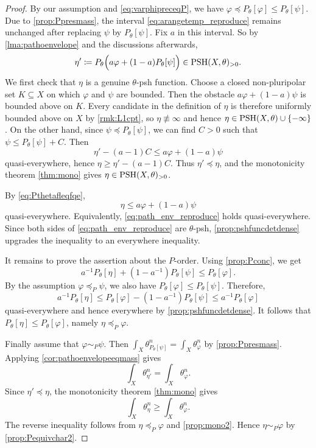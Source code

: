 \begin{proof}
    By our assumption and \eqref{eq:varphipreceqP}, we have $\varphi\preceq P_{\theta}[\varphi]\leq P_{\theta}[\psi]$.
    Due to \cref{prop:Ppresmass}, the interval \eqref{eq:arangetemp_reproduce} remains unchanged after replacing $\psi$ by $P_{\theta}[\psi]$. Fix $a$ in this interval.
    So by \cref{lma:pathoenvelope} and the discussions afterwards,
    \[
        \eta'\coloneqq  P_{\theta}\Bigl(a\varphi+(1-a)P_{\theta}[\psi]\Bigr)\in \mathrm{PSH}(X,\theta)_{>0}.
    \]
    We first check that $\eta$ is a genuine $\theta$-psh function. Choose a closed non-pluripolar set $K\subseteq X$ on which $\varphi$ and $\psi$ are bounded. Then the obstacle $a\varphi+(1-a)\psi$ is bounded above on $K$.
    Every candidate in the definition of $\eta$ is therefore uniformly bounded above on $X$ by \cref{rmk:L1cpt}, so $\eta\not\equiv \infty$ and hence $\eta\in \mathrm{PSH}(X,\theta)\cup\{-\infty\}$.
    On the other hand, since $\psi\preceq P_{\theta}[\psi]$, we can find $C>0$ such that $\psi\leq P_{\theta}[\psi]+C$. Then
    \[
        \eta'-(a-1)C\leq a\varphi+(1-a)\psi
    \]
    quasi-everywhere, hence $\eta\geq \eta'-(a-1)C$. Thus $\eta'\preceq \eta$, and the monotonicity theorem \cref{thm:mono} gives $\eta\in \mathrm{PSH}(X,\theta)_{>0}$.

    By \eqref{eq:Pthetafleqfqe},
    \[
        \eta\leq a\varphi+(1-a)\psi
    \]
    quasi-everywhere. Equivalently, \eqref{eq:path_env_reproduce} holds quasi-everywhere. Since both sides of \eqref{eq:path_env_reproduce} are $\theta$-psh, \cref{prop:pshfuncdetdense} upgrades the inequality to an everywhere inequality.

    It remains to prove the assertion about the $P$-order.
    Using \cref{prop:Pconc}, we get
    \[
        a^{-1} P_{\theta}[\eta]+\left(1-a^{-1}\right)P_{\theta}[\psi] \leq P_{\theta}[\varphi].
    \]
    By the assumption $\varphi\preceq_P\psi$, we also have $P_{\theta}[\varphi]\leq P_{\theta}[\psi]$. Therefore,
    \[
        a^{-1} P_{\theta}[\eta]\leq P_{\theta}[\varphi]-\left(1-a^{-1}\right)P_{\theta}[\psi]\leq a^{-1} P_{\theta}[\varphi]
    \]
    quasi-everywhere and hence everywhere by \cref{prop:pshfuncdetdense}. It follows that $P_{\theta}[\eta]\leq P_{\theta}[\varphi]$, namely $\eta\preceq_P\varphi$.

    Finally assume that $\varphi\sim_P\psi$. Then $\int_X\theta_{P_{\theta}[\psi]}^n=\int_X\theta_{\varphi}^n$ by \cref{prop:Ppresmass}.
    Applying \cref{cor:pathoenvelopeeqmass} gives
    \[
        \int_X\theta_{\eta'}^n=\int_X\theta_{\varphi}^n.
    \]
    Since $\eta'\preceq\eta$, the monotonicity theorem \cref{thm:mono} gives
    \[
        \int_X\theta_{\eta}^n\geq \int_X\theta_{\varphi}^n.
    \]
    The reverse inequality follows from $\eta\preceq_P\varphi$ and \cref{prop:mono2}. Hence $\eta\sim_P\varphi$ by \cref{prop:Pequivchar2}.
\end{proof}


